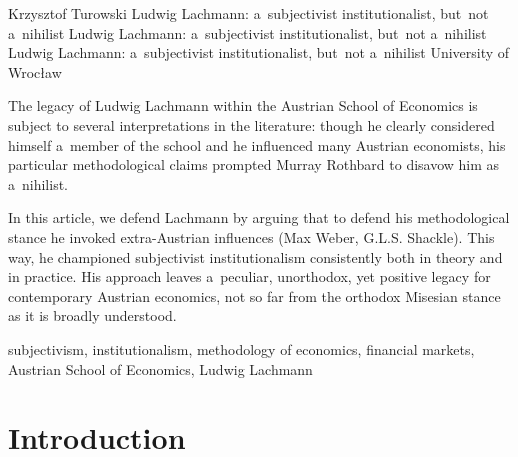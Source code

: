 \begin{artengenv}{Krzysztof Turowski}
	{Ludwig Lachmann: a~subjectivist institutionalist, but~not a~nihilist}
	{Ludwig Lachmann: a~subjectivist institutionalist, but~not a~nihilist}
	{Ludwig Lachmann: a~subjectivist institutionalist, but~not a~nihilist}
	{University of Wrocław\label{turowski-first}}
	{The legacy of Ludwig Lachmann within the Austrian School of Economics is subject to several interpretations in the literature: though he clearly considered himself a~member of the school and he influenced many Austrian economists, his particular methodological claims prompted Murray Rothbard to disavow him as a~nihilist.
	
	
	
	In this article, we defend Lachmann by arguing that to defend his methodological stance he invoked extra-Austrian influences (Max Weber, G.L.S. Shackle). This way, he championed subjectivist institutionalism consistently both in theory and in practice. His approach leaves a~peculiar, unorthodox, yet positive legacy for contemporary Austrian economics, not so far from the orthodox Misesian stance as it is broadly understood.
	}
	{subjectivism, institutionalism, methodology of economics, financial markets, Austrian School of Economics, Ludwig Lachmann}





\section{Introduction}


\end{artengenv}
